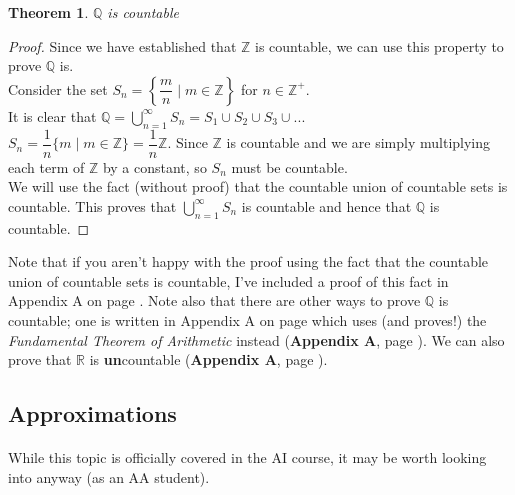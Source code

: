 \documentclass[12pt, a4paper, titlepage, twoside]{article}
\newcommand*{\Z}{\mathbb{Z}}
\newcommand*{\Q}{\mathbb{Q}}
\newcommand*{\R}{\mathbb{R}}
\newtheorem*{theorem*}{Theorem}
\begin{document}
	\begin{pf}
		\label{pf:q-count}
		\begin{theorem*}
			$\Q$ is countable
		\end{theorem*}

		\tcbline		
		
		\begin{proof}
			Since we have established that $\Z$ is countable, we can use this property to prove $\Q$ is.\\
			
			Consider the set $S_n = \left\lbrace \dfrac{m}{n} \mid m \in \Z \right\rbrace$ for $n \in \Z^+$.\\
			
			It is clear that $\displaystyle \Q = \mathop{\bigcup}_{n=1}^{\infty} S_n = S_1 \cup S_2 \cup S_3 \cup ...$\\
			
			$S_n = \dfrac{1}{n} \{m \mid m \in \Z\} = \dfrac{1}{n} \Z$. Since $\Z$ is countable and we are simply multiplying
			each term of $\Z$ by a constant, so $S_n$ must be countable.\\
			
			We will use the fact (without proof) that the countable union of countable sets is countable. This proves that $\displaystyle 
			\mathop{\bigcup}_{n=1}^{\infty} S_n$ is countable and hence that $\Q$ is countable.
		\end{proof}
		\hfill
		
		Note that if you aren't happy with the proof using the fact that the countable union of countable sets is countable,
		I've included a proof of this fact in Appendix A on page \pageref*{apA:ctble-union}. Note also that
		there are other ways to prove $\Q$ is countable; one is written in Appendix A on page \pageref*{apA:q-count-fta} which
		uses (and proves!) the \textit{Fundamental Theorem of Arithmetic} instead (\textbf{Appendix A}, page \pageref*{apA:fta}). We can also
		prove that $\R$ is \textbf{un}countable (\textbf{Appendix A}, page \pageref*{apA:r-uncount}).
	\end{pf}
	
	\subsection{Approximations}
	
	\paragraph{}
	While this topic is officially covered in the AI course, it may be worth looking into anyway (as an AA student).
	
\end{document}
